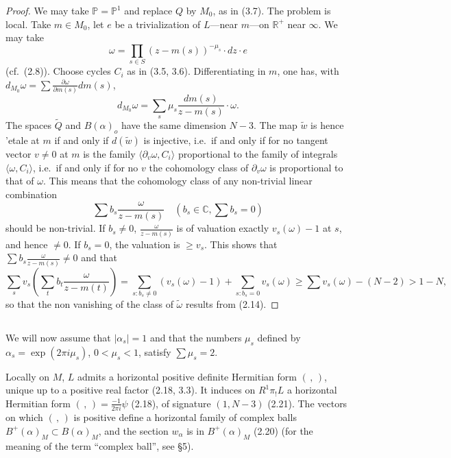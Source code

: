 \documentclass[12pt,a4paper]{article}
\theoremstyle{plain}
\theoremstyle{definition}
\theoremstyle{remark}
\newcommand{\CC}{\mathbb{C}}
\newcommand{\PP}{\mathbb{P}}
\newcommand{\RR}{\mathbb{R}}
\numberwithin{equation}{section}
\providecommand{\CC}{\mathbb{C}}
\providecommand{\PP}{\mathbb{P}}
\providecommand{\RR}{\mathbb{R}}
\begin{document}
\begin{proof}
We may take $\PP = \PP^1$ and replace $Q$ by $M_0$, as in (3.7). The problem is local. Take $m \in M_0$, let $e$ be a trivialization of $L$---near $m$---on $\RR^+$ near $\infty$. We may take
\[
\omega = \prod_{s \in S} (z - m(s))^{-\mu_s} \cdot dz \cdot e
\]
(cf.\ (2.8)). Choose cycles $C_i$ as in (3.5, 3.6). Differentiating in $m$, one has, with $d_{M_0}\omega = \sum \frac{\partial \omega}{\partial m(s)} dm(s)$,
\[
d_{M_0}\omega = \sum_s \mu_s \frac{dm(s)}{z - m(s)} \cdot \omega.
\]
The spaces $\widetilde{Q}$ and $B(\alpha)_o$ have the same dimension $N-3$. The map $\widetilde{w}$ is hence \\'etale at $m$ if and only if $d(\widetilde{w})$ is injective, i.e.\ if and only if for no tangent vector $v \neq 0$ at $m$ is the family $\langle \partial_v \omega, C_i \rangle$ proportional to the family of integrals $\langle \omega, C_i \rangle$, i.e.\ if and only if for no $v$ the cohomology class of $\partial_v \omega$ is proportional to that of $\omega$. This means that the cohomology class of any non-trivial linear combination
\[
\sum b_s \frac{\omega}{z - m(s)} \quad (b_s \in \CC, \sum b_s = 0)
\]
should be non-trivial. If $b_s \neq 0$, $\frac{\omega}{z-m(s)}$ is of valuation exactly $v_s(\omega) - 1$ at $s$, and hence $\neq 0$. If $b_s = 0$, the valuation is $\geq v_s$. This shows that $\sum b_s \frac{\omega}{z-m(s)} \neq 0$ and that
\[
\sum_s v_s\left(\sum_t b_t \frac{\omega}{z-m(t)}\right) = \sum_{s: b_s \neq 0} (v_s(\omega) - 1) + \sum_{s: b_s = 0} v_s(\omega) \geq \sum v_s(\omega) - (N-2) > 1-N,
\]
so that the non vanishing of the class of $\widetilde{\omega}$ results from (2.14).
\end{proof}

\subsection{}
We will now assume that $|\alpha_s| = 1$ and that the numbers $\mu_s$ defined by $\alpha_s = \exp(2\pi i \mu_s)$, $0 < \mu_s < 1$, satisfy $\sum \mu_s = 2$.

Locally on $M$, $L$ admits a horizontal positive definite Hermitian form $(\,,\,)$, unique up to a positive real factor (2.18, 3.3). It induces on $R^1\pi_!L$ a horizontal Hermitian form $(\,,\,) = \frac{-1}{2\pi i}\psi$ (2.18), of signature $(1, N-3)$ (2.21). The vectors on which $(\,,\,)$ is positive define a horizontal family of complex balls $B^+(\alpha)_M \subset B(\alpha)_M$, and the section $w_\alpha$ is in $B^+(\alpha)_M$ (2.20) (for the meaning of the term ``complex ball'', see \S 5).
\end{document}
